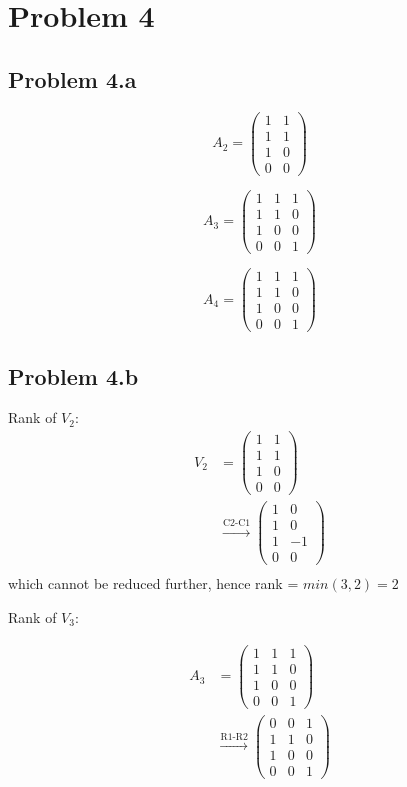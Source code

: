 \documentclass[a4paper]{article}
\begin{document}
\section*{Problem 4}
\subsection*{Problem 4.a}

$$A_2 = \begin{pmatrix} 1 & 1 \\
1 & 1\\
1 & 0\\
0 & 0
\end{pmatrix}$$

$$A_3 = \begin{pmatrix} 1 & 1 & 1\\
1 & 1 & 0\\
1 & 0 & 0\\
0 & 0 & 1
\end{pmatrix}$$


$$A_4 = \begin{pmatrix} 1 & 1 & 1\\
1 & 1 & 0\\
1 & 0 & 0\\
0 & 0 & 1
\end{pmatrix}$$
\subsection*{Problem 4.b}
Rank of $V_2$:
\begin{align*}
V_2 &= \begin{pmatrix} 1 & 1 \\
1 & 1\\
1 & 0\\
0 & 0
\end{pmatrix}\\
&\stackrel{\text{C2-C1}}{\longrightarrow}\begin{pmatrix} 1 & 0 \\
1 & 0\\
1 & -1\\
0 & 0
\end{pmatrix}\\ 
\end{align*}
which cannot be reduced further, hence rank = $min(3,2) = 2$

Rank of  $V_3$:

\begin{align*} A_3 &= \begin{pmatrix} 1 & 1 & 1\\
1 & 1 & 0\\
1 & 0 & 0\\
0 & 0 & 1
\end{pmatrix}\\
&\stackrel{\text{R1-R2}}{\longrightarrow} \begin{pmatrix} 0 & 0 & 1\\
1 & 1 & 0\\
1 & 0 & 0\\
0 & 0 & 1
\end{pmatrix}\\
\end{align*}
\end{document}
